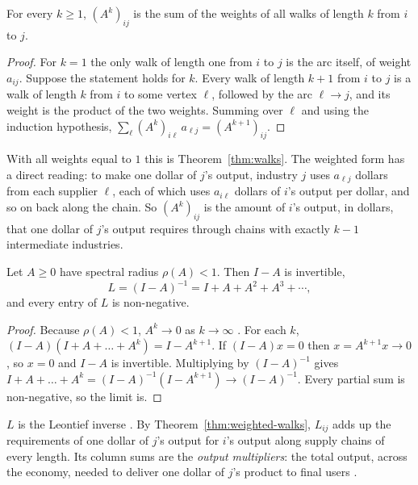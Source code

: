 \begin{theorem}
\label{thm:weighted-walks}
For every $k\ge1$, $(A^k)_{ij}$ is the sum of the weights of all walks of
length $k$ from $i$ to $j$.
\end{theorem}

\begin{proof}
For $k=1$ the only walk of length one from $i$ to $j$ is the arc itself, of
weight $a_{ij}$. Suppose the statement holds for $k$. Every walk of length
$k+1$ from $i$ to $j$ is a walk of length $k$ from $i$ to some vertex $\ell$,
followed by the arc $\ell\to j$, and its weight is the product of the two
weights. Summing over $\ell$ and using the induction hypothesis,
$\sum_\ell (A^k)_{i\ell}\,a_{\ell j}=(A^{k+1})_{ij}$.
\end{proof}

With all weights equal to $1$ this is Theorem~\ref{thm:walks}. The weighted
form has a direct reading: to make one dollar of $j$'s output, industry $j$
uses $a_{\ell j}$ dollars from each supplier $\ell$, each of which uses
$a_{i\ell}$ dollars of $i$'s output per dollar, and so on back along the chain.
So $(A^k)_{ij}$ is the amount of $i$'s output, in dollars, that one dollar of
$j$'s output requires through chains with exactly $k-1$ intermediate
industries.

\begin{theorem}
\label{thm:neumann}
Let $A\ge0$ have spectral radius $\rho(A)<1$. Then $I-A$ is invertible,
\begin{equation}\label{eq:neumann}
  L=(I-A)^{-1}=I+A+A^2+A^3+\cdots,
\end{equation}
and every entry of $L$ is non-negative.
\end{theorem}

\begin{proof}
Because $\rho(A)<1$, $A^k\to0$ as $k\to\infty$ \cite[Sec.~5.6]{horn2013}.
For each $k$,
$(I-A)(I+A+\dots+A^k)=I-A^{k+1}$. If $(I-A)x=0$ then $x=A^{k+1}x\to0$, so
$x=0$ and $I-A$ is invertible. Multiplying by $(I-A)^{-1}$ gives
$I+A+\dots+A^k=(I-A)^{-1}(I-A^{k+1})\to(I-A)^{-1}$. Every partial sum is
non-negative, so the limit is.
\end{proof}

$L$ is the Leontief inverse \cite{leontief1936}. By
Theorem~\ref{thm:weighted-walks}, $L_{ij}$ adds up the requirements of one
dollar of $j$'s output for $i$'s output along supply chains of every length.
Its column sums are the \emph{output multipliers}: the total output, across
the economy, needed to deliver one dollar of $j$'s product to final users
\cite[Ch.~6]{miller2009}.

